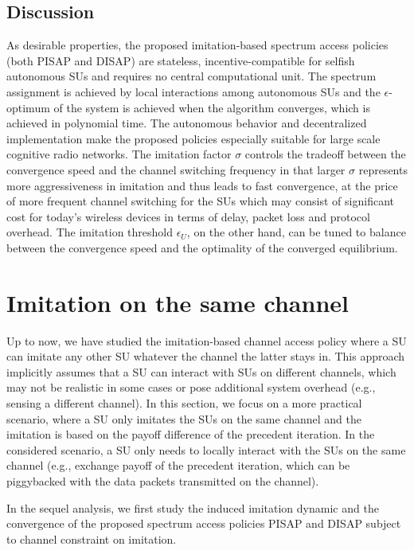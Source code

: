 \documentclass[12pt, onecolumn]{IEEEtran}
\theoremstyle{plain}
\theoremstyle{definition}
\begin{document}
\subsection{Discussion}

As desirable properties, the proposed imitation-based spectrum access policies (both PISAP and DISAP) are stateless, incentive-compatible for selfish autonomous SUs and requires no central computational unit. The spectrum assignment is achieved by local interactions among autonomous SUs and the $\epsilon$-optimum of the system is achieved when the algorithm converges, which is achieved in polynomial time. The autonomous behavior and decentralized implementation make the proposed policies especially suitable for large scale cognitive radio networks. The imitation factor $\sigma$ controls the tradeoff between the convergence speed and the channel switching frequency in that larger $\sigma$ represents more aggressiveness in imitation and thus leads to fast convergence, at the price of more frequent channel switching for the SUs which may consist of significant cost for today's wireless devices in terms of delay, packet loss and protocol overhead. The imitation threshold $\epsilon_U$, on the other hand, can be tuned to balance between the convergence speed and the optimality of the converged equilibrium. 

\section{Imitation on the same channel}
\label{sec:NewScenario}





Up to now, we have studied the imitation-based channel access policy where a SU can imitate any other SU whatever the channel the latter stays in. This approach implicitly assumes that a  SU can interact with SUs on different channels, which may not be realistic in some cases or pose additional system overhead (e.g., sensing a different channel). In this section, we focus on a more practical scenario, where a SU only imitates the SUs on the same channel and the imitation is based on the payoff difference of the precedent iteration. In the considered scenario, a SU only needs to locally interact with the SUs on the same channel (e.g., exchange payoff of the precedent iteration, which can be piggybacked with the data packets transmitted on the channel).




In the sequel analysis, we first study the induced imitation dynamic and the convergence of the proposed spectrum access policies PISAP and DISAP subject to channel constraint on imitation.
\end{document}
